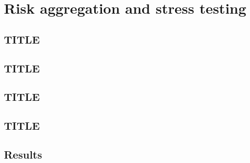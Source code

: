 \chapter{Risk aggregation and stress testing}
\label{ch:aggregation-stress}


\section{TITLE}
\label{sec:m25}


\section{TITLE}
\label{sec:m26}


\section{TITLE}
\label{sec:m27}


\section{TITLE}
\label{sec:m31}


\section{Results}
\label{sec:results-aggregation-stress}

